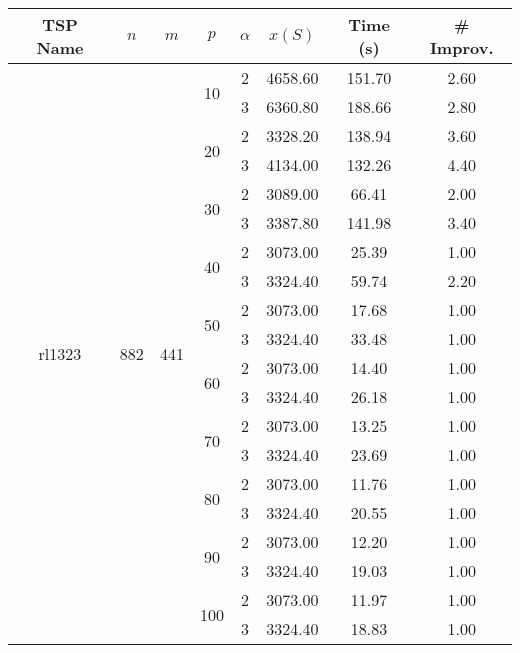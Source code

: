 \begin{tabular}{|ccccc|ccc|}
\toprule
       TSP Name & $n$ & $m$ & $p$ & $\alpha$   & $x(S)$ &  Time (s) &  \# Improv. \\
\midrule
\multirow{20}{*}{rl1323} & \multirow{20}{*}{882} & \multirow{20}{*}{441} & \multirow{2}{*}{10} & 2 & 4658.60 & 151.70 &     2.60 \\
       &     &     &     & 3 & 6360.80 & 188.66 &     2.80 \\
\cline{4-8}
       &     &     & \multirow{2}{*}{20} & 2 & 3328.20 & 138.94 &     3.60 \\
       &     &     &     & 3 & 4134.00 & 132.26 &     4.40 \\
\cline{4-8}
       &     &     & \multirow{2}{*}{30} & 2 & 3089.00 &  66.41 &     2.00 \\
       &     &     &     & 3 & 3387.80 & 141.98 &     3.40 \\
\cline{4-8}
       &     &     & \multirow{2}{*}{40} & 2 & 3073.00 &  25.39 &     1.00 \\
       &     &     &     & 3 & 3324.40 &  59.74 &     2.20 \\
\cline{4-8}
       &     &     & \multirow{2}{*}{50} & 2 & 3073.00 &  17.68 &     1.00 \\
       &     &     &     & 3 & 3324.40 &  33.48 &     1.00 \\
\cline{4-8}
       &     &     & \multirow{2}{*}{60} & 2 & 3073.00 &  14.40 &     1.00 \\
       &     &     &     & 3 & 3324.40 &  26.18 &     1.00 \\
\cline{4-8}
       &     &     & \multirow{2}{*}{70} & 2 & 3073.00 &  13.25 &     1.00 \\
       &     &     &     & 3 & 3324.40 &  23.69 &     1.00 \\
\cline{4-8}
       &     &     & \multirow{2}{*}{80} & 2 & 3073.00 &  11.76 &     1.00 \\
       &     &     &     & 3 & 3324.40 &  20.55 &     1.00 \\
\cline{4-8}
       &     &     & \multirow{2}{*}{90} & 2 & 3073.00 &  12.20 &     1.00 \\
       &     &     &     & 3 & 3324.40 &  19.03 &     1.00 \\
\cline{4-8}
       &     &     & \multirow{2}{*}{100} & 2 & 3073.00 &  11.97 &     1.00 \\
       &     &     &     & 3 & 3324.40 &  18.83 &     1.00 \\
\bottomrule
\end{tabular}

